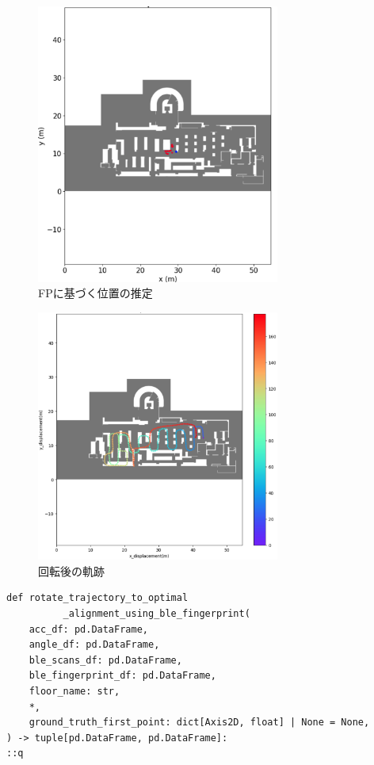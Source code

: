 \begin{figure}[ht]
	\centering
	\includegraphics[width=80mm]{image/fingerprint-location.jpg}
	\caption{FPに基づく位置の推定}    \label{fig:fingerprint-location}
\end{figure}


\begin{figure}[ht]
	\centering
	\includegraphics[width=80mm]{image/fingerprint-rotate.jpg}
	\caption{回転後の軌跡}    \label{fig:fingerprint-rotate}
\end{figure}


\begin{lstlisting}[caption={BLEビーコンのFPを使用した初期方向補正}, label=lst:rotate-trajectory-using-ble-fingerprint]
def rotate_trajectory_to_optimal
          _alignment_using_ble_fingerprint(
    acc_df: pd.DataFrame,
    angle_df: pd.DataFrame,
    ble_scans_df: pd.DataFrame,
    ble_fingerprint_df: pd.DataFrame,
    floor_name: str,
    *,
    ground_truth_first_point: dict[Axis2D, float] | None = None,
) -> tuple[pd.DataFrame, pd.DataFrame]:                                        ::q
\end{lstlisting}
